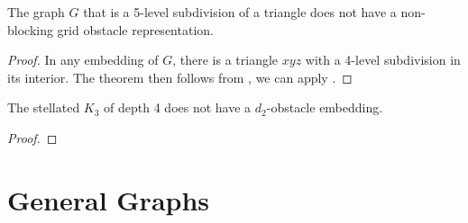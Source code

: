 \documentclass{patmorin}
\begin{document}
\begin{thm}
   The graph $G$ that is a 5-level subdivision of a triangle does not
   have a non-blocking grid obstacle representation.
\end{thm}

\begin{proof}
   In any embedding of $G$, there is a triangle $xyz$ with a 4-level
   subdivision in its interior.  The theorem then follows from
   , we can apply .
\end{proof}

\begin{thm}
  The stellated $K_3$ of depth 4 does not have a $d_2$-obstacle embedding.
\end{thm}

\begin{proof}
   
\end{proof}

\section{General Graphs}









\end{document}
